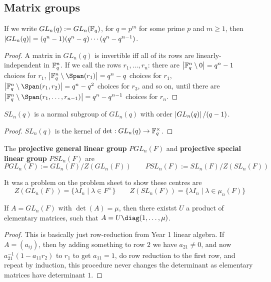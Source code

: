 \documentclass{article}
\begin{document}
\subsection{Matrix groups}

\begin{proposition}
    If we write $GL_n(q):=GL_n(\mathbb{F}_q)$, for $q=p^m$ for some prime $p$ and $m\geq 1$, then $\left| GL_n(q) \right| = (q^n-1)(q^n-q)\cdots (q^n-q^{n-1})$.
    \begin{proof}
        A matrix in $GL_n(q)$ is invertible iff all of its rows are linearly-independent in $\mathbb{F}_q^n$. If we call the rows $r_1,\ldots,r_n$: there are $\left| \mathbb{F}_q^n\setminus 0 \right| = q^n-1$ choices for $r_1$, $\abs{\bF_q^n\setminus \Span(r_1)}=q^n-q$ choices for $r_1$, $\abs{\bF_q^n\setminus\Span(r_1,r_2)} = q^n-q^2$ choices for $r_3$, and so on, until there are $\abs{\bF_q^n\setminus\Span(r_1,\ldots,r_{n-1})} = q^n-q^{n-1}$ choices for $r_n$.
    \end{proof}
\end{proposition}

\begin{proposition}
    $SL_n(q)$ is a normal subgroup of $GL_n(q)$ with order $\left| GL_n(q) \right|/(q-1)$.
    \begin{proof}
        $SL_n(q)$ is the kernel of $\det:GL_n(q)\rightarrow \mathbb{F}_q^\times$.
    \end{proof}
\end{proposition}

\begin{definition}
    The \textbf{projective general linear group} $PGL_n(F)$ and \textbf{projective special linear group} $PSL_n(F)$ are \[
    PGL_n(F) := GL_n(F)/Z(GL_n(F)) \qquad PSL_n(F) := SL_n(F) / Z(SL_n(F))
    \]
\end{definition}

It was a problem on the problem sheet to show these centres are \[Z(GL_n(F)) = \{\lambda I_n \mid \lambda \in F^\times\} \qquad Z(SL_n(F)) = \{\lambda I_n \mid \lambda\in \mu_n(F)\}\]

\begin{proposition}
    If $A=GL_n(F)$ with $\det(A)=\mu$, then there existst $U$ a product of elementary matrices, such that $A = U\diag(1,\ldots,\mu)$.\begin{proof}
        This is basically just row-reduction from Year 1 linear algebra. If $A=(a_{ij})$, then by adding something to row $2$ we have $a_{21}\neq 0$, and now $a_{21}^{-1}(1-a_{11}r_2)$ to $r_1$ to get $a_{11}=1$, do row reduction to the first row, and repeat by induction, this procedure never changes the determinant as elementary matrices have determinant $1$.
    \end{proof}
\end{proposition}
\end{document}

